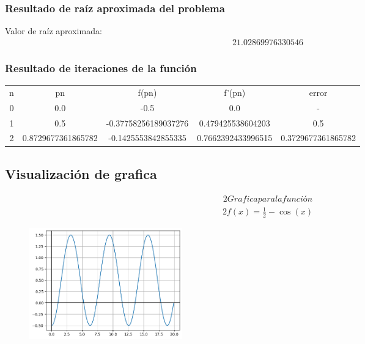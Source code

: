 \documentclass{article}%
\begin{document}
\subsubsection{Resultado de raíz aproximada del problema}%
\label{ssubsec:Resultadoderazaproximadadelproblema}%
Valor de raíz aproximada:%
\begin{alignat*}{2}%
1.02869976330546%
\end{alignat*}%
\subsubsection{Resultado de iteraciones de la función}%
\label{ssubsec:Resultadodeiteracionesdelafuncin}%
\begin{tabular}{c|c|c|c|c}%
\hline%
n&pn&f(pn)&f'(pn)&error\\%
0&0.0&{-}0.5&0.0&{-}\\%
1&0.5&{-}0.37758256189037276&0.479425538604203&0.5\\%
2&0.8729677361865782&{-}0.1425553842855335&0.7662392433996515&0.3729677361865782\\%
\hline%
\end{tabular}

%
\subsection{Visualización de grafica}%
\label{subsec:Visualizacindegrafica}%
\begin{alignat*}{2}%

Grafica para la función%
\end{alignat*}%
\begin{alignat*}{2}%
f(x) = \frac{1}{2} - \cos{\left(x \right)}%
\end{alignat*}%


\begin{figure}[h]%
\centering%
\includegraphics[width=250px]{ejemplo09_graph.png}%
\end{figure}

%
\end{document}
